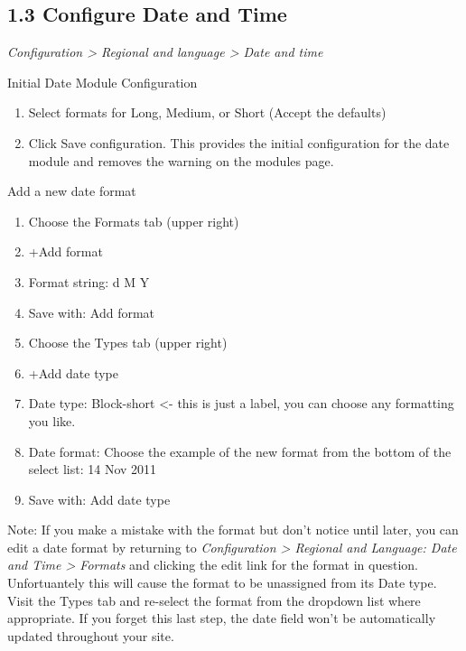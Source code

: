 \documentclass[letterpaper,10pt,english]{sphinxmanual}
\begin{document}
\subsection{1.3 Configure Date and Time}
\label{event_calendar:configure-date-and-time}
\emph{Configuration \textgreater{} Regional and language \textgreater{} Date and time}

Initial Date Module Configuration
\begin{enumerate}
\item {} 
Select formats for Long, Medium, or Short (Accept the defaults)

\item {} 
Click Save configuration. This provides the initial configuration for the date module and removes the warning on the modules page.

\end{enumerate}

Add a new date format
\begin{enumerate}
\item {} 
Choose the Formats tab (upper right)

\item {} 
+Add format

\item {} 
Format string: d M Y

\item {} 
Save with: Add format

\item {} 
Choose the Types tab (upper right)

\item {} 
+Add date type

\item {} 
Date type: Block-short \textless{}- this is just a label, you can choose any formatting you like.

\item {} 
Date format: Choose the example of the new format from the bottom of the select list: 14 Nov 2011

\item {} 
Save with: Add date type

\end{enumerate}

Note: If you make a mistake with the format but don't notice until later, you can edit a date format by returning to \emph{Configuration \textgreater{} Regional and Language: Date and Time \textgreater{} Formats} and clicking the edit link for the format in question. Unfortuantely this will cause the format to be unassigned from its Date type. Visit the Types tab and re-select the format from the dropdown list where appropriate.  If you forget this last step, the date field won't be automatically updated throughout your site.
\end{document}
